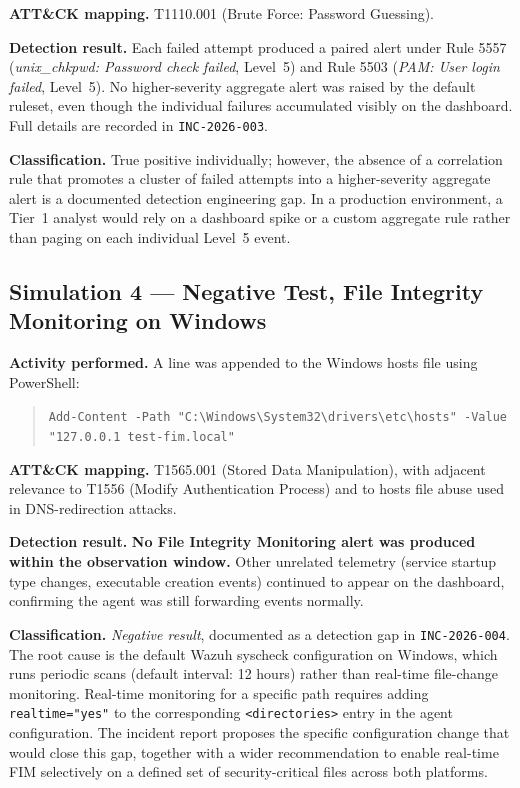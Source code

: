 \textbf{ATT\&CK mapping.} T1110.001 (Brute Force: Password Guessing).

\textbf{Detection result.} Each failed attempt produced a paired alert
under Rule 5557 (\textit{unix\_chkpwd: Password check failed}, Level~5) and
Rule 5503 (\textit{PAM: User login failed}, Level~5). No higher-severity
aggregate alert was raised by the default ruleset, even though the
individual failures accumulated visibly on the dashboard. Full details are
recorded in \texttt{INC-2026-003}.

\textbf{Classification.} True positive individually; however, the absence
of a correlation rule that promotes a cluster of failed attempts into a
higher-severity aggregate alert is a documented detection engineering gap.
In a production environment, a Tier~1 analyst would rely on a dashboard
spike or a custom aggregate rule rather than paging on each individual
Level~5 event.

\subsection{Simulation 4 --- Negative Test, File Integrity Monitoring on Windows}
\label{sec:sim4}

\textbf{Activity performed.} A line was appended to the Windows hosts file
using PowerShell:

\begin{quote}\small
\texttt{Add-Content -Path "C:\textbackslash Windows\textbackslash System32\textbackslash drivers\textbackslash etc\textbackslash hosts" -Value "127.0.0.1 test-fim.local"}
\end{quote}

\textbf{ATT\&CK mapping.} T1565.001 (Stored Data Manipulation), with
adjacent relevance to T1556 (Modify Authentication Process) and to hosts
file abuse used in DNS-redirection attacks.

\textbf{Detection result.} \textbf{No File Integrity Monitoring alert
was produced within the observation window.} Other unrelated telemetry
(service startup type changes, executable creation events) continued to
appear on the dashboard, confirming the agent was still forwarding events
normally.

\textbf{Classification.} \textit{Negative result}, documented as a
detection gap in \texttt{INC-2026-004}. The root cause is the default
Wazuh syscheck configuration on Windows, which runs periodic scans (default
interval: 12 hours) rather than real-time file-change monitoring. Real-time
monitoring for a specific path requires adding
\texttt{realtime="yes"} to the corresponding
\texttt{<directories>} entry in the agent configuration. The incident
report proposes the specific configuration change that would close this
gap, together with a wider recommendation to enable real-time FIM
selectively on a defined set of security-critical files across both
platforms.

